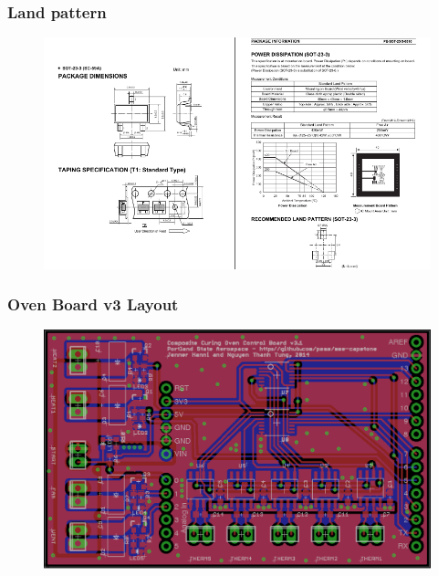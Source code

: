 \documentclass{beamer}
\begin{document}

\begin{frame}
\frametitle{Land pattern}
\begin{figure}
\includegraphics[width=1\linewidth]{sot23.png}
\end{figure}
\end{frame}


\begin{frame}
\frametitle{Oven Board v3 Layout}
\begin{figure}
\includegraphics[width=1\linewidth]{v3board.png}
\end{figure}
\end{frame}

\end{document}
